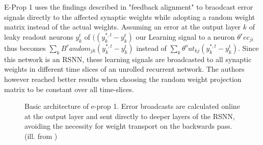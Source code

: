 \documentclass[letterpaper, 10 pt, conference]{ieeeconf}  %
\begin{document}
E-Prop 1 uses the findings described in "feedback alignment" to braodcast error signals directly to the affected synaptic weights 
while adopting a random weight matrix instead of the actual weights. Assuming an error at the output layer $k$ of leaky readout neurons 
$y^t_k$ of $((y^{*,t}_k-y^t_k)$ our Learning signal to a neuron $\theta ^rec_{ji}$ thus becomes $\sum_k B^random_{jk}(y^{*,t}_k-y^t_k)$
instead of $\sum_k \theta^out_{kj}(y^{*,t}_k-y^t_k)$. Since this network is an RSNN, these learning signals are broadcasted to all synaptic
weights in different time slices of an unrolled recurrent network. The authors however reached better results when choosing the random 
weight projection matrix to be constant over all time-slices.

\begin{figure}[thpb]
        \centering
  \caption{Basic architecture of e-prop 1. Error broadcasts are calculated online at the output layer and sent directly
  to deeper layers of the RSNN, avoiding the necessity for weight transport on the backwards pass.(ill. 
  from \cite{bellecBiologicallyInspiredAlternatives2019})
  }
        \label{figurelabel}
     \end{figure}
     
\end{document}
